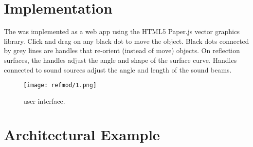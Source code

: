 \section{Implementation}
\label{sec:refmod-implementation}
The  was implemented as a web app using the HTML5
Paper.js vector graphics
library. 
 Click and drag on any black dot to move the
object. Black dots connected by grey lines are handles that
re-orient (instead of move) objects. On reflection surfaces, the handles
adjust the angle and shape of the surface curve. Handles connected to
sound sources adjust the angle and length of the sound beams. 
\begin{figure}[h]
  \texttt{[image: refmod/1.png]}
  \caption[]{ user interface.}
  \label{fig:refmod-simple}
\end{figure}

\section{ Architectural Example}
\label{sec:refmod-user-interf}

